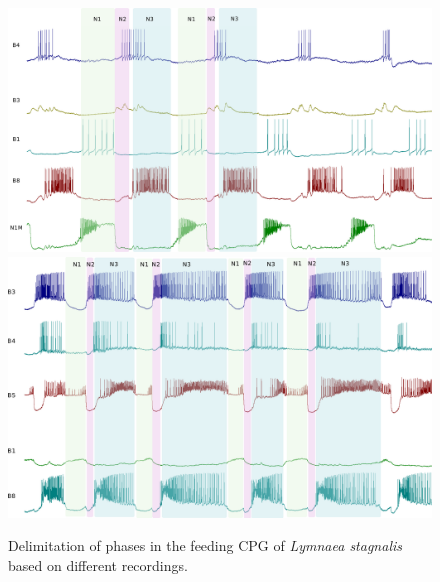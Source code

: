 \begin{figure}[bth!]
\centering
\includegraphics[width=\textwidth]{img/invariants/example_phases_1.pdf}
\\
\vspace{10pt}
\includegraphics[width=\textwidth]{img/invariants/example_phases_2.pdf}
\caption{Delimitation of phases in the feeding CPG of \textit{Lymnaea stagnalis} based on different recordings.}
\label{fig:example lymnaea phases recording}
\end{figure}
